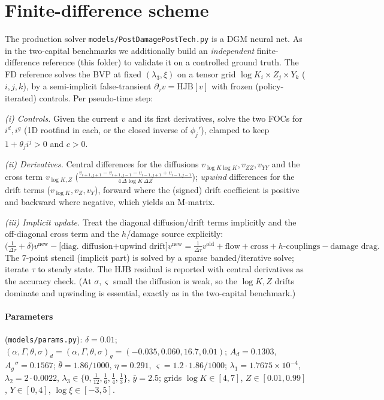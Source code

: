 \documentclass[11pt]{article}
\begin{document}
\section{Finite-difference scheme}

The production solver \texttt{models/PostDamagePostTech.py} is a DGM neural net. As in the
two-capital benchmarks we additionally build an \emph{independent} finite-difference reference
(this folder) to validate it on a controlled ground truth. The FD reference
solves the BVP at fixed $(\lambda_3,\xi)$ on a tensor grid
$\log K_i\times Z_j\times Y_k$ ($i,j,k$), by a semi-implicit false-transient
$\partial_\tau v=\text{HJB}[v]$ with frozen (policy-iterated) controls. Per pseudo-time step:

\emph{(i) Controls.} Given the current $v$ and its first derivatives, solve the two FOCs for
$i^d,i^g$ (1D rootfind in each, or the closed inverse of $\phi_j'$), clamped to keep
$1+\theta_ji^j>0$ and $c>0$.

\emph{(ii) Derivatives.} Central differences for the diffusions
$v_{\log K\log K},v_{ZZ},v_{YY}$ and the cross term $v_{\log K,Z}$
($\tfrac{v_{i+1,j+1}-v_{i+1,j-1}-v_{i-1,j+1}+v_{i-1,j-1}}{4\,\Delta\log K\,\Delta Z}$);
\emph{upwind} differences for the drift terms ($v_{\log K},v_Z,v_Y$), forward where the
(signed) drift coefficient is positive and backward where negative, which yields an M-matrix.

\emph{(iii) Implicit update.} Treat the diagonal diffusion/drift terms implicitly and the
off-diagonal cross term and the $h$/damage source explicitly:
$\big(\tfrac1{\Delta\tau}+\delta\big)v^{\text{new}}-\big[\text{diag.\ diffusion+upwind drift}\big]v^{\text{new}}
=\tfrac1{\Delta\tau}v^{\text{old}}+\text{flow}+\text{cross}+\text{$h$-couplings}-\text{damage drag}.$
The 7-point stencil (implicit part) is solved by a sparse banded/iterative solve; iterate
$\tau$ to steady state. The HJB residual is reported with central derivatives as the accuracy
check. (At $\sigma,\varsigma$ small the diffusion is weak, so the $\log K,Z$ drifts dominate and
upwinding is essential, exactly as in the two-capital benchmark.)

\paragraph{Parameters} (\texttt{models/params.py}): $\delta=0.01$;
$(\alpha,\Gamma,\theta,\sigma)_d=(\alpha,\Gamma,\theta,\sigma)_g=(-0.035,0.060,16.7,0.01)$;
$A_d=0.1303$, $A_g''=0.1567$; $\bar\theta=1.86/1000$, $\eta=0.291$,
$\varsigma=1.2\cdot1.86/1000$; $\lambda_1=1.7675\!\times\!10^{-4}$, $\lambda_2=2\cdot0.0022$,
$\lambda_3\in\{0,\tfrac1{12},\tfrac16,\tfrac14,\tfrac13\}$, $\bar y=2.5$; grids
$\log K\in[4,7]$, $Z\in[0.01,0.99]$, $Y\in[0,4]$, $\log\xi\in[-3,5]$.
\end{document}

